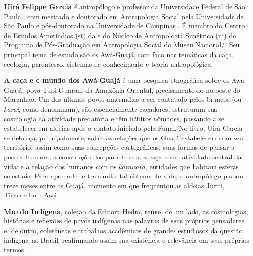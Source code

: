 \textbf{Uirá Felippe Garcia} é antropólogo e professor da Universidade Federal de São Paulo , com mestrado e doutorado em Antropologia Social pela Universidade de São Paulo  e pós-doutorado na Universidade de Campinas . É membro do Centro de Estudos Ameríndios (st) da  e do Núcleo de Antropologia Simétrica (ni) do Programa de Pós-Graduação em Antropologia Social do Museu Nacional/. Seu principal tema de estudo são os Awá-Guajá, com foco nas temáticas da caça, ecologia, parentesco, sistemas de conhecimento e teoria antropológica.

	
\textbf{A caça e o mundo dos Awá-Guajá} é uma pesquisa etnográfica sobre os Awá-Guajá, povo Tupi-Guarani da Amazônia Oriental, precisamente do noroeste do Maranhão. Um dos últimos povos ameríndios a ser contatado pelos brancos (ou \emph{karai}, como denominam), são essencialmente caçadores, estruturam sua cosmologia na atividade predatória e têm hábitos nômades, passando a se estabelecer em aldeias após o contato iniciado pela Funai. No livro, Uirá Garcia se debruça, principalmente, sobre as relações que os Guajá estabelecem com seu território, assim como suas concepções cartográficas; suas formas de pensar a pessoa humana; a construção dos parentescos; a caça como atividade central da vida; e a relação dos humanos com os \emph{karawara}, entidades que habitam esferas celestiais. Para apreender e transmitir tal sistema de vida, o antropólogo passou treze meses entre os Guajá, momento em que frequentou as aldeias Juriti, Tiracambu e Awá.


\textbf{Mundo Indígena}, coleção da Editora Hedra, reúne, de um lado, as cosmologias, histórias
e reflexões de povos indígenas nas palavras de seus próprios pensadores e, de outro, coletâneas
e trabalhos acadêmicos de grandes estudiosos da questão indígena no Brasil, reafirmando assim sua
existência e relevância em seus próprios termos.\par